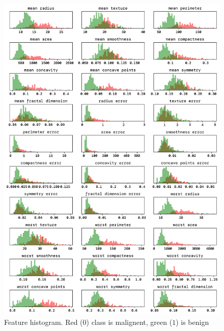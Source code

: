 \documentclass[twoside,11pt]{report}
\begin{document}
    \begin{figure}
        \begin{center}
            \includegraphics[width=\textwidth]{../runsAndFigures/feature_histogram.png}
        \end{center}
        \caption{Feature histogram. Red ($0$) class is malignent, green ($1$) is benign}\label{fig:feature_histogram}
    \end{figure}
\end{document}
